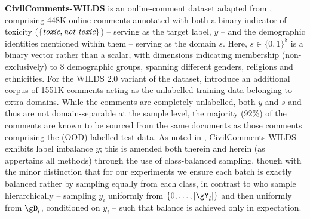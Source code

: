 \textbf{CivilComments-WILDS} is an online-comment dataset adapted from \citet{borkan2019nuanced},
comprising 448K online comments annotated with both a binary indicator of toxicity
($\{\mathrm{\emph{toxic}, \emph{not toxic}}\}$) -- serving as the target label, $y$ -- and the
demographic identities mentioned within them -- serving as the domain $s$. 
%
Here, $s \in \{0, 1\}^8$ is a binary vector rather than a scalar, with dimensions indicating
membership (non-exclusively) to 8 demographic groups, spanning different genders, religions and
ethnicities. For the WILDS 2.0 variant of the dataset, \citet{SagWeiLeeGaoetal22} introduce an
additional corpus of 1551K comments acting as the unlabelled training data belonging to extra
domains.
%
While the comments are completely unlabelled, \wrt{} both $y$ and $s$ and thus are not
domain-separable at the sample level, the majority ($92\%$) of the comments are known to be sourced
from the same documents as those comments comprising the (OOD) labelled test data. 
%
As noted in \citet{SagWeiLeeGaoetal22}, CivilComments-WILDS exhibits label imbalance \wrt{} $y$;
this is amended both therein and herein (as appertains all methods) through the use of
class-balanced sampling, though with the minor distinction that for our experiments we ensure each
batch is exactly balanced rather by sampling equally from each class, in contrast to
\citet{SagWeiLeeGaoetal22} who sample hierarchically -- sampling $y_i$ uniformly from $\{0, \dots,
|\gY_l|\}$ and then uniformly from $\gD_l$, conditioned on $y_i$ -- such that balance is achieved
only in expectation.
